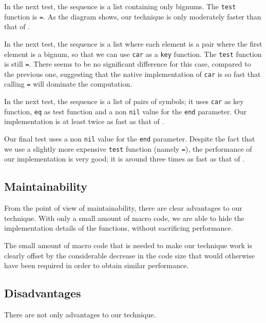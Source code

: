 In the next test, the sequence is a list containing only bignums.  The
\texttt{test} function is \texttt{=}.  As the diagram shows, our
technique is only moderately faster than that of \sbcl{}.


In the next test, the sequence is a list where each element is a pair
where the first element is a bignum, so that we can use \texttt{car}
as a \texttt{key} function.  The \texttt{test} function is still
\texttt{=}.  There seems to be no significant difference for this
case, compared to the previous one, suggesting that the native
implementation of \texttt{car} is so fast that calling \texttt{=} will
dominate the computation.


In the next test, the sequence is a list of pairs of symbols; it uses
\texttt{car} as key function, \texttt{eq} as test function and a non
\texttt{nil} value for the \texttt{end} parameter. Our implementation
is at least twice as fast as that of \sbcl{}.


Our final test uses a non \texttt{nil} value for the \texttt{end}
parameter.  Despite the fact that we use a slightly more expensive
\texttt{test} function (namely \texttt{=}), the performance of our
implementation is very good; it is around three times as fast as that
of \sbcl{}.


\subsection{Maintainability}

From the point of view of maintainability, there are clear advantages
to our technique.  With only a small amount of macro code, we are able
to hide the implementation details of the functions, without
sacrificing performance.

The small amount of macro code that is needed to make our technique
work is clearly offset by the considerable decrease in the code size
that would otherwise have been required in order to obtain similar
performance.

\subsection{Disadvantages}

There are not only advantages to our technique.

